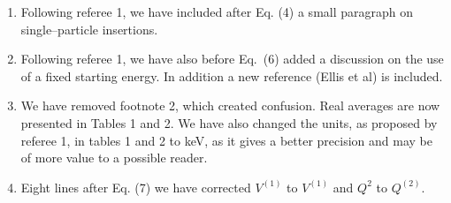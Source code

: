 \begin{enumerate}
\item Following referee 1, we have included after Eq. (4) a small paragraph
on single--particle insertions.
\item Following referee 1, we have also before Eq.\ (6) added
a discussion on the use of a fixed starting energy. In addition a
new reference (Ellis et al) is included.
\item We have removed
footnote 2, which created confusion. Real averages
are now presented in Tables 1 and 2. We have also changed the units, as proposed
by referee 1,  in tables 1 and
2 to keV, as it gives a better precision and may be of more
value to a possible reader. 
\item Eight lines after Eq. (7) we have corrected $V^(1)$ to
$V^{(1)}$ and $Q^2$ to $Q^{(2)}$.
\end{enumerate}








